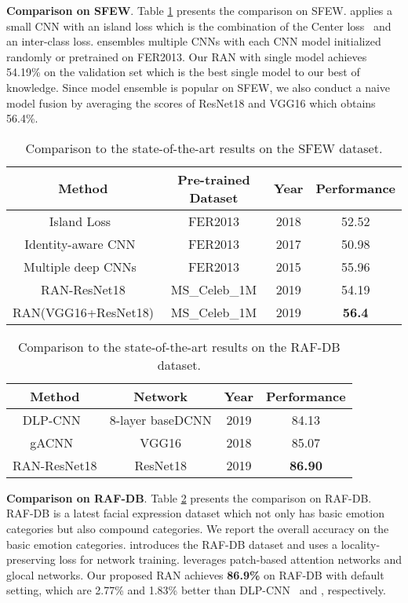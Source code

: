 \documentclass[journal]{IEEEtran}
\begin{document}
\textbf{Comparison on SFEW}.
Table \ref{tab:soa_3} presents the comparison on SFEW. \cite{cai2018island} applies a small CNN with an island loss which is the combination of the Center loss~\cite{wen2016discriminative} and an inter-class loss. \cite{yu2015image} ensembles multiple CNNs with each CNN model initialized randomly or pretrained on FER2013. Our RAN with single model achieves 54.19\% on the validation set which is the best single model to our best of knowledge. Since model ensemble is popular on SFEW, we also conduct a naive model fusion by averaging the scores of  ResNet18 and VGG16 which obtains 56.4\%.

\begin{table}[tp]
\center
\caption{Comparison to the state-of-the-art results on the SFEW dataset.}
\label{tab:soa_3}
\scriptsize
\begin{tabular}{@{}cccc@{}}
\toprule
 Method   &Pre-trained Dataset&Year & Performance  \\
 \midrule
Island Loss~\cite{cai2018island}    &FER2013 &2018 & 52.52  \\
Identity-aware CNN~\cite{meng2017identity}   &FER2013 &2017 & 50.98  \\
Multiple deep CNNs~\cite{yu2015image}   &FER2013 &2015 & 55.96  \\
RAN-ResNet18   &MS\_Celeb\_1M&2019 & 54.19  \\
RAN(VGG16+ResNet18) &MS\_Celeb\_1M&2019 & \textbf{56.4}  \\
\bottomrule
\end{tabular}
\end{table}

\begin{table}[tp]
\center
\caption{Comparison to the state-of-the-art results on the RAF-DB dataset.}
\label{tab:soa_4}
\scriptsize
\begin{tabular}{@{}cccc@{}}
\toprule
 Method   &Network &Year & Performance  \\
 \midrule
DLP-CNN~\cite{8453893}  & 8-layer baseDCNN & 2019 & 84.13  \\
gACNN~\cite{8576656} &VGG16 & 2018 &85.07 \\
RAN-ResNet18   &ResNet18&2019 & \textbf{86.90}  \\
\bottomrule
\end{tabular}
\end{table}

\textbf{Comparison on RAF-DB}.
Table \ref{tab:soa_4} presents the comparison on RAF-DB. RAF-DB is a latest facial expression dataset which not only has basic emotion categories but also compound categories. We report the overall accuracy on the basic emotion categories.
\cite{8453893} introduces the RAF-DB dataset and uses a locality-preserving loss for network training. \cite{8576656} leverages patch-based attention networks and glocal networks. Our proposed RAN achieves \textbf{86.9\%} on RAF-DB with default setting, which are 2.77\% and 1.83\% better than DLP-CNN~\cite{8453893} and \cite{8576656}, respectively. 
\end{document}
